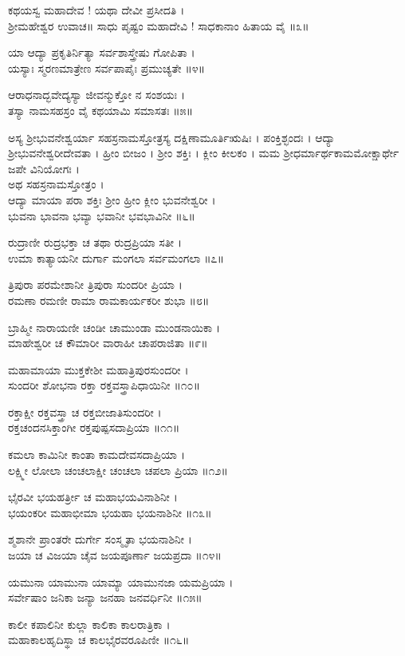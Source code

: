 ಕಥಯಸ್ವ ಮಹಾದೇವ ! ಯಥಾ ದೇವೀ ಪ್ರಸೀದತಿ ।\\

ಶ್ರೀಮಹೇಶ್ವರ ಉವಾಚ॥
ಸಾಧು ಪೃಷ್ಟಂ ಮಹಾದೇವಿ ! ಸಾಧಕಾನಾಂ ಹಿತಾಯ ವೈ ॥೩॥

ಯಾ ಆದ್ಯಾ ಪ್ರಕೃತಿರ್ನಿತ್ಯಾ ಸರ್ವಶಾಸ್ತ್ರೇಷು ಗೋಪಿತಾ ।\\
ಯಸ್ಯಾಃ ಸ್ಮರಣಮಾತ್ರೇಣ ಸರ್ವಪಾಪೈಃ ಪ್ರಮುಚ್ಯತೇ ॥೪॥

ಆರಾಧನಾದ್ಭವೇದ್ಯಸ್ಯಾ ಜೀವನ್ಮುಕ್ತೋ ನ ಸಂಶಯಃ ।\\
ತಸ್ಯಾ ನಾಮಸಹಸ್ರಂ ವೈ ಕಥಯಾಮಿ ಸಮಾಸತಃ ॥೫॥

ಅಸ್ಯ ಶ್ರೀಭುವನೇಶ್ವರ್ಯಾ ಸಹಸ್ರನಾಮಸ್ತೋತ್ರಸ್ಯ ದಕ್ಷಿಣಾಮೂರ್ತಿಋಷಿಃ । ಪಂಕ್ತಿಶ್ಛಂದಃ । ಆದ್ಯಾ ಶ್ರೀಭುವನೇಶ್ವರೀದೇವತಾ । ಹ್ರೀಂ ಬೀಜಂ । ಶ್ರೀಂ ಶಕ್ತಿಃ । ಕ್ಲೀಂ ಕೀಲಕಂ । ಮಮ ಶ್ರೀಧರ್ಮಾರ್ಥಕಾಮಮೋಕ್ಷಾರ್ಥೇ ಜಪೇ ವಿನಿಯೋಗಃ  ।\\

ಅಥ ಸಹಸ್ರನಾಮಸ್ತೋತ್ರಂ ।\\
ಆದ್ಯಾ ಮಾಯಾ ಪರಾ ಶಕ್ತಿಃ ಶ್ರೀಂ ಹ್ರೀಂ ಕ್ಲೀಂ ಭುವನೇಶ್ವರೀ ।\\
ಭುವನಾ ಭಾವನಾ ಭವ್ಯಾ ಭವಾನೀ ಭವಭಾವಿನೀ ॥೬॥

ರುದ್ರಾಣೀ ರುದ್ರಭಕ್ತಾ ಚ ತಥಾ ರುದ್ರಪ್ರಿಯಾ ಸತೀ ।\\
ಉಮಾ ಕಾತ್ಯಾಯನೀ ದುರ್ಗಾ ಮಂಗಲಾ ಸರ್ವಮಂಗಲಾ ॥೭॥

ತ್ರಿಪುರಾ ಪರಮೇಶಾನೀ ತ್ರಿಪುರಾ ಸುಂದರೀ ಪ್ರಿಯಾ ।\\
ರಮಣಾ ರಮಣೀ ರಾಮಾ ರಾಮಕಾರ್ಯಕರೀ ಶುಭಾ ॥೮॥

ಬ್ರಾಹ್ಮೀ ನಾರಾಯಣೀ ಚಂಡೀ ಚಾಮುಂಡಾ ಮುಂಡನಾಯಿಕಾ ।\\
ಮಾಹೇಶ್ವರೀ ಚ ಕೌಮಾರೀ ವಾರಾಹೀ ಚಾಪರಾಜಿತಾ ॥೯॥

ಮಹಾಮಾಯಾ ಮುಕ್ತಕೇಶೀ ಮಹಾತ್ರಿಪುರಸುಂದರೀ ।\\
ಸುಂದರೀ ಶೋಭನಾ ರಕ್ತಾ ರಕ್ತವಸ್ತ್ರಾಪಿಧಾಯಿನೀ ॥೧೦॥

ರಕ್ತಾಕ್ಷೀ ರಕ್ತವಸ್ತ್ರಾ ಚ ರಕ್ತಬೀಜಾತಿಸುಂದರೀ ।\\
ರಕ್ತಚಂದನಸಿಕ್ತಾಂಗೀ ರಕ್ತಪುಷ್ಪಸದಾಪ್ರಿಯಾ ॥೧೧॥

ಕಮಲಾ ಕಾಮಿನೀ ಕಾಂತಾ ಕಾಮದೇವಸದಾಪ್ರಿಯಾ ।\\
ಲಕ್ಷ್ಮೀ ಲೋಲಾ ಚಂಚಲಾಕ್ಷೀ ಚಂಚಲಾ ಚಪಲಾ ಪ್ರಿಯಾ ॥೧೨॥

ಭೈರವೀ ಭಯಹರ್ತ್ರೀ ಚ ಮಹಾಭಯವಿನಾಶಿನೀ ।\\
ಭಯಂಕರೀ ಮಹಾಭೀಮಾ ಭಯಹಾ ಭಯನಾಶಿನೀ ॥೧೩॥

ಶ್ಮಶಾನೇ ಪ್ರಾಂತರೇ ದುರ್ಗೇ ಸಂಸ್ಮೃತಾ ಭಯನಾಶಿನೀ ।\\
ಜಯಾ ಚ ವಿಜಯಾ ಚೈವ ಜಯಪೂರ್ಣಾ ಜಯಪ್ರದಾ ॥೧೪॥

ಯಮುನಾ ಯಾಮುನಾ ಯಾಮ್ಯಾ ಯಾಮುನಜಾ ಯಮಪ್ರಿಯಾ ।\\
ಸರ್ವೇಷಾಂ ಜನಿಕಾ ಜನ್ಯಾ ಜನಹಾ ಜನವರ್ಧಿನೀ ॥೧೫॥

ಕಾಲೀ ಕಪಾಲಿನೀ ಕುಲ್ಲಾ ಕಾಲಿಕಾ ಕಾಲರಾತ್ರಿಕಾ ।\\
ಮಹಾಕಾಲಹೃದಿಸ್ಥಾ ಚ ಕಾಲಭೈರವರೂಪಿಣೀ ॥೧೬॥


